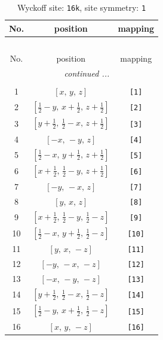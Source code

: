 \documentclass[fleqn,8pt]{jsarticle}
\begin{document}
\begin{longtable}{ccc}
\caption{Wyckoff site: {\tt 16k}, site symmetry: {\tt 1}}
 \\
 \hline \hline
No. & position & mapping \\ \hline \endfirsthead

\multicolumn{2}{l}{\tablename\ \thetable{}} \\
 \hline \hline
No. & position & mapping \\ \hline \endhead

 \hline \hline
\multicolumn{2}{r}{\footnotesize\it continued ...} \\ \endfoot

 \hline \hline
\multicolumn{2}{r}{} \\ \endlastfoot

1 & $\left[ x,\, y,\, z \right]$ & {\tt [1]} \\ \hline
2 & $\left[ \frac{1}{2} - y,\, x + \frac{1}{2},\, z + \frac{1}{2} \right]$ & {\tt [2]} \\ \hline
3 & $\left[ y + \frac{1}{2},\, \frac{1}{2} - x,\, z + \frac{1}{2} \right]$ & {\tt [3]} \\ \hline
4 & $\left[ - x,\, - y,\, z \right]$ & {\tt [4]} \\ \hline
5 & $\left[ \frac{1}{2} - x,\, y + \frac{1}{2},\, z + \frac{1}{2} \right]$ & {\tt [5]} \\ \hline
6 & $\left[ x + \frac{1}{2},\, \frac{1}{2} - y,\, z + \frac{1}{2} \right]$ & {\tt [6]} \\ \hline
7 & $\left[ - y,\, - x,\, z \right]$ & {\tt [7]} \\ \hline
8 & $\left[ y,\, x,\, z \right]$ & {\tt [8]} \\ \hline
9 & $\left[ x + \frac{1}{2},\, \frac{1}{2} - y,\, \frac{1}{2} - z \right]$ & {\tt [9]} \\ \hline
10 & $\left[ \frac{1}{2} - x,\, y + \frac{1}{2},\, \frac{1}{2} - z \right]$ & {\tt [10]} \\ \hline
11 & $\left[ y,\, x,\, - z \right]$ & {\tt [11]} \\ \hline
12 & $\left[ - y,\, - x,\, - z \right]$ & {\tt [12]} \\ \hline
13 & $\left[ - x,\, - y,\, - z \right]$ & {\tt [13]} \\ \hline
14 & $\left[ y + \frac{1}{2},\, \frac{1}{2} - x,\, \frac{1}{2} - z \right]$ & {\tt [14]} \\ \hline
15 & $\left[ \frac{1}{2} - y,\, x + \frac{1}{2},\, \frac{1}{2} - z \right]$ & {\tt [15]} \\ \hline
16 & $\left[ x,\, y,\, - z \right]$ & {\tt [16]} \\
\end{longtable}
\end{document}
